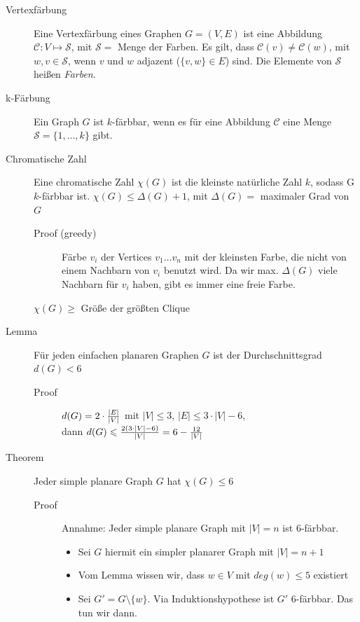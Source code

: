 \begin{description}
    \item[Vertexfärbung] Eine Vertexfärbung eines Graphen $G=(V,E)$ ist eine Abbildung $\mathcal{C} \colon V \mapsto \mathcal{S}$, mit $\mathcal{S}=$ Menge der Farben. Es gilt, dass $\mathcal{C}(v) \neq \mathcal{C}(w)$, mit $w,v \in \mathcal{S}$, wenn $v$ und $w$ adjazent ($\{v,w\} \in E$) sind. Die Elemente von $\mathcal{S}$ heißen \emph{Farben}.
    \item[k-Färbung] Ein Graph $G$ ist $k$-färbbar, wenn es für eine Abbildung $\mathcal{C}$ eine Menge $\mathcal{S}=\{1,\dots,k\}$ gibt.
    \item[Chromatische Zahl] Eine chromatische Zahl $\chi(G)$ ist die kleinste natürliche Zahl $k$, sodass G $k$-färbbar ist. $\chi(G) \leqslant \Delta(G) + 1$, mit $\Delta(G) = $ maximaler Grad von $G$
        \begin{description}
            \item[Proof (greedy)] Färbe $v_i$ der Vertices $v_1 \dots v_n$ mit der kleinsten Farbe, die nicht von einem Nachbarn von $v_i$ benutzt wird. Da wir max. $\Delta(G)$ viele Nachbarn für $v_i$ haben, gibt es immer eine freie Farbe.
        \end{description}
        $\chi(G) \geqslant$ Größe der größten Clique
    \item[Lemma] Für jeden einfachen planaren Graphen $G$ ist der Durchschnittsgrad $d(G) < 6$
        \begin{description}
            \item[Proof] $d(G) = 2 \cdot {|E| \over |V|}$ mit $|V| \leqslant 3$, $|E| \leqslant 3  \cdot |V| - 6$,\\dann $d(G) \leqslant {2(3 \cdot |V|-6) \over |V|} = 6-{12 \over |V|}$
        \end{description}
    \newpage
    \item[Theorem] Jeder simple planare Graph $G$ hat $\chi(G) \leqslant 6$
        \begin{description}
            \item[Proof] Annahme: Jeder simple planare Graph mit $|V| = n$ ist $6$-färbbar.
            \begin{itemize}
                \item Sei $G$ hiermit ein simpler planarer Graph mit $|V| = n+1$
                \item Vom Lemma wissen wir, dass $w \in V$ mit $deg(w) \leqslant 5$ existiert
                \item Sei $G' = G \setminus \{w\}$. Via Induktionshypothese ist $G'$ 6-färbbar. Das tun wir dann.

\end{itemize}
\end{description}
\end{description}

